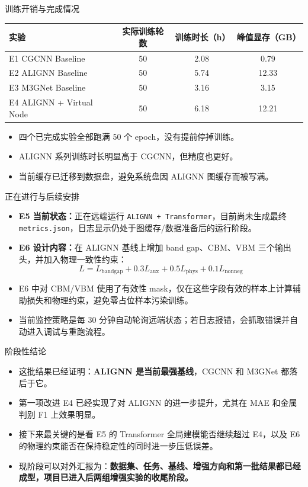 \documentclass{beamer}
\begin{document}
\begin{frame}{训练开销与完成情况}
\scriptsize
\centering
\begin{tabular}{p{3.2cm}ccc}
\toprule
实验 & 实际训练轮数 & 训练时长（h） & 峰值显存（GB） \\
\midrule
E1 CGCNN Baseline & 50 & 2.08 & 0.79 \\
E2 ALIGNN Baseline & 50 & 5.74 & 12.33 \\
E3 M3GNet Baseline & 50 & 3.16 & 3.15 \\
E4 ALIGNN + Virtual Node & 50 & 6.18 & 12.21 \\
\bottomrule
\end{tabular}

\vspace{2mm}
\small
\begin{itemize}
  \item 四个已完成实验全部跑满 50 个 epoch，没有提前停掉训练。
  \item ALIGNN 系列训练时长明显高于 CGCNN，但精度也更好。
  \item 当前缓存已迁移到数据盘，避免系统盘因 ALIGNN 图缓存而被写满。
\end{itemize}
\end{frame}

\begin{frame}{正在进行与后续安排}
\small
\begin{itemize}
  \item \textbf{E5 当前状态：}正在远端运行 \texttt{ALIGNN + Transformer}，目前尚未生成最终 \texttt{metrics.json}，日志显示仍处于图缓存/数据准备后的运行阶段。
  \item \textbf{E6 设计内容：}在 ALIGNN 基线上增加 band gap、CBM、VBM 三个输出头，并加入物理一致性约束：
  \[
  L = L_{\text{bandgap}} + 0.3L_{\text{aux}} + 0.5L_{\text{phys}} + 0.1L_{\text{nonneg}}
  \]
  \item E6 中对 CBM/VBM 使用了有效性 mask，仅在这些字段有效的样本上计算辅助损失和物理约束，避免零占位样本污染训练。
  \item 当前监控策略是每 30 分钟自动轮询远端状态；若日志报错，会抓取错误并自动进入调试与重跑流程。
\end{itemize}
\end{frame}

\begin{frame}{阶段性结论}
\begin{itemize}
  \item 这批结果已经证明：\textbf{ALIGNN 是当前最强基线}，CGCNN 和 M3GNet 都落后于它。
  \item 第一项改进 E4 已经实现了对 ALIGNN 的进一步提升，尤其在 MAE 和金属判别 F1 上效果明显。
  \item 接下来最关键的是看 E5 的 Transformer 全局建模能否继续超过 E4，以及 E6 的物理约束能否在保持稳定性的同时进一步压低误差。
  \item 现阶段可以对外汇报为：\textbf{数据集、任务、基线、增强方向和第一批结果都已经成型，项目已进入后两组增强实验的收尾阶段。}
\end{itemize}
\end{frame}
\end{document}
